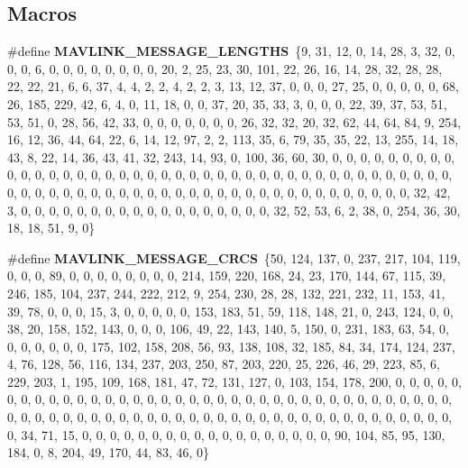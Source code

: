 \subsection*{Macros}
\begin{DoxyCompactItemize}
\item 
\#define \textbf{ M\+A\+V\+L\+I\+N\+K\+\_\+\+M\+E\+S\+S\+A\+G\+E\+\_\+\+L\+E\+N\+G\+T\+HS}~\{9, 31, 12, 0, 14, 28, 3, 32, 0, 0, 0, 6, 0, 0, 0, 0, 0, 0, 0, 0, 20, 2, 25, 23, 30, 101, 22, 26, 16, 14, 28, 32, 28, 28, 22, 22, 21, 6, 6, 37, 4, 4, 2, 2, 4, 2, 2, 3, 13, 12, 37, 0, 0, 0, 27, 25, 0, 0, 0, 0, 0, 68, 26, 185, 229, 42, 6, 4, 0, 11, 18, 0, 0, 37, 20, 35, 33, 3, 0, 0, 0, 22, 39, 37, 53, 51, 53, 51, 0, 28, 56, 42, 33, 0, 0, 0, 0, 0, 0, 0, 26, 32, 32, 20, 32, 62, 44, 64, 84, 9, 254, 16, 12, 36, 44, 64, 22, 6, 14, 12, 97, 2, 2, 113, 35, 6, 79, 35, 35, 22, 13, 255, 14, 18, 43, 8, 22, 14, 36, 43, 41, 32, 243, 14, 93, 0, 100, 36, 60, 30, 0, 0, 0, 0, 0, 0, 0, 0, 0, 0, 0, 0, 0, 0, 0, 0, 0, 0, 0, 0, 0, 0, 0, 0, 0, 0, 0, 0, 0, 0, 0, 0, 0, 0, 0, 0, 0, 0, 0, 0, 0, 0, 0, 0, 0, 0, 0, 0, 0, 0, 0, 0, 0, 0, 0, 0, 0, 0, 0, 0, 0, 0, 0, 0, 0, 0, 0, 0, 0, 0, 32, 42, 3, 0, 0, 0, 0, 0, 0, 0, 0, 0, 0, 0, 0, 0, 0, 0, 0, 0, 0, 32, 52, 53, 6, 2, 38, 0, 254, 36, 30, 18, 18, 51, 9, 0\}
\item 
\#define \textbf{ M\+A\+V\+L\+I\+N\+K\+\_\+\+M\+E\+S\+S\+A\+G\+E\+\_\+\+C\+R\+CS}~\{50, 124, 137, 0, 237, 217, 104, 119, 0, 0, 0, 89, 0, 0, 0, 0, 0, 0, 0, 0, 214, 159, 220, 168, 24, 23, 170, 144, 67, 115, 39, 246, 185, 104, 237, 244, 222, 212, 9, 254, 230, 28, 28, 132, 221, 232, 11, 153, 41, 39, 78, 0, 0, 0, 15, 3, 0, 0, 0, 0, 0, 153, 183, 51, 59, 118, 148, 21, 0, 243, 124, 0, 0, 38, 20, 158, 152, 143, 0, 0, 0, 106, 49, 22, 143, 140, 5, 150, 0, 231, 183, 63, 54, 0, 0, 0, 0, 0, 0, 0, 175, 102, 158, 208, 56, 93, 138, 108, 32, 185, 84, 34, 174, 124, 237, 4, 76, 128, 56, 116, 134, 237, 203, 250, 87, 203, 220, 25, 226, 46, 29, 223, 85, 6, 229, 203, 1, 195, 109, 168, 181, 47, 72, 131, 127, 0, 103, 154, 178, 200, 0, 0, 0, 0, 0, 0, 0, 0, 0, 0, 0, 0, 0, 0, 0, 0, 0, 0, 0, 0, 0, 0, 0, 0, 0, 0, 0, 0, 0, 0, 0, 0, 0, 0, 0, 0, 0, 0, 0, 0, 0, 0, 0, 0, 0, 0, 0, 0, 0, 0, 0, 0, 0, 0, 0, 0, 0, 0, 0, 0, 0, 0, 0, 0, 0, 0, 0, 0, 0, 0, 34, 71, 15, 0, 0, 0, 0, 0, 0, 0, 0, 0, 0, 0, 0, 0, 0, 0, 0, 0, 0, 90, 104, 85, 95, 130, 184, 0, 8, 204, 49, 170, 44, 83, 46, 0\}
\item 

\end{DoxyCompactItemize}
